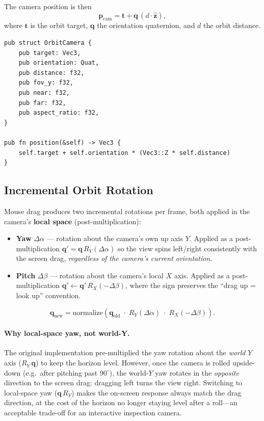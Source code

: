 \documentclass[11pt]{article}
\begin{document}
The camera position is then
\[
  \mathbf{p}_{\text{cam}} = \mathbf{t} + \mathbf{q} \, (d \cdot \hat{\mathbf{z}}),
\]
where $\mathbf{t}$ is the orbit target, $\mathbf{q}$ the orientation
quaternion, and $d$ the orbit distance.

\begin{lstlisting}
pub struct OrbitCamera {
    pub target: Vec3,
    pub orientation: Quat,
    pub distance: f32,
    pub fov_y: f32,
    pub near: f32,
    pub far: f32,
    pub aspect_ratio: f32,
}

pub fn position(&self) -> Vec3 {
    self.target + self.orientation * (Vec3::Z * self.distance)
}
\end{lstlisting}

\subsection{Incremental Orbit Rotation}

Mouse drag produces two incremental rotations per frame, both applied
in the camera's \textbf{local space} (post-multiplication):
\begin{itemize}
  \item \textbf{Yaw} $\Delta\alpha$ --- rotation about the camera's
        own up axis $Y$.  Applied as a post-multiplication
        $\mathbf{q}' = \mathbf{q} \, R_Y(\Delta\alpha)$ so the view
        spins left/right consistently with the screen drag,
        \emph{regardless of the camera's current orientation}.
  \item \textbf{Pitch} $\Delta\beta$ --- rotation about the camera's
        local $X$ axis.  Applied as a post-multiplication
        $\mathbf{q}' \leftarrow \mathbf{q}' \, R_X(-\Delta\beta)$,
        where the sign preserves the ``drag up = look up''
        convention.
\end{itemize}

\[
  \mathbf{q}_{\text{new}}
  = \mathrm{normalize}\!\left(
      \mathbf{q}_{\text{old}} \;\cdot\; R_Y(\Delta\alpha) \;\cdot\; R_X(-\Delta\beta)
    \right).
\]

\paragraph{Why local-space yaw, not world-Y.}
The original implementation pre-multiplied the yaw rotation about the
\emph{world} $Y$ axis ($R_Y \, \mathbf{q}$) to keep the horizon level.
However, once the camera is rolled upside-down (e.g.\ after pitching
past $90^\circ$), the world-$Y$ yaw rotates in the \emph{opposite}
direction to the screen drag: dragging left turns the view right.
Switching to local-space yaw ($\mathbf{q} \, R_Y$) makes the on-screen
response always match the drag direction, at the cost of the horizon
no longer staying level after a roll---an acceptable trade-off for an
interactive inspection camera.
\end{document}
